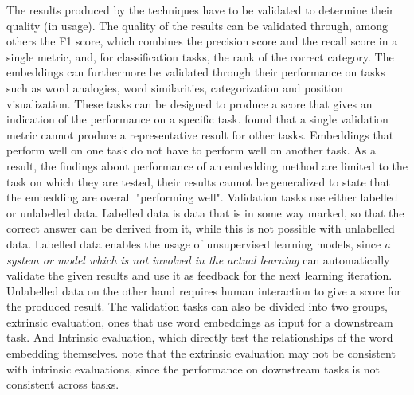 \documentclass[../../Thesis.tex]{subfiles}
\begin{document}
The results produced by the techniques have to be validated to determine their quality (in usage). The quality of the results can be validated through, among others the F1 score, which combines the precision score and the recall score in a single metric, and, for classification tasks, the rank of the correct category. The embeddings can furthermore be validated through their performance on tasks such as word analogies, word similarities, categorization and position visualization. These tasks can be designed to produce a score that gives an indication of the performance on a specific task. \citet{schnabel2015evaluation} found that a single validation metric cannot produce a representative result for other tasks. Embeddings that perform well on one task do not have to perform well on another task. As a result, the findings about performance of an embedding method are limited to the task on which they are tested, their results cannot be generalized to state that the embedding are overall "performing well". Validation tasks use either labelled or unlabelled data. Labelled data is data that is in some way marked, so that the correct answer can be derived from it, while this is not possible with unlabelled data. Labelled data enables the usage of unsupervised learning models, since  \textit{a system or model which is not involved in the actual learning} can automatically validate the given results and use it as feedback for the next learning iteration. Unlabelled data on the other hand requires human interaction to give a score for the produced result. The validation tasks can also be divided into two groups, extrinsic evaluation, ones that use word embeddings as input for a downstream task. And Intrinsic evaluation, which directly test the relationships of the word embedding themselves. \citet{schnabel2015evaluation} note that the extrinsic evaluation may not be consistent with intrinsic evaluations, since the performance on downstream tasks is not consistent across tasks.
\end{document}
